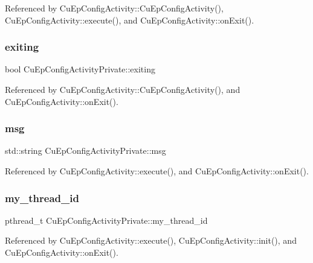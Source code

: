 Referenced by Cu\+Ep\+Config\+Activity\+::\+Cu\+Ep\+Config\+Activity(), Cu\+Ep\+Config\+Activity\+::execute(), and Cu\+Ep\+Config\+Activity\+::on\+Exit().

\mbox{\label{classCuEpConfigActivityPrivate_a7af8e2037c937736127bc9831356d975}} 
\subsubsection{exiting}
{\footnotesize\ttfamily bool Cu\+Ep\+Config\+Activity\+Private\+::exiting}



Referenced by Cu\+Ep\+Config\+Activity\+::\+Cu\+Ep\+Config\+Activity(), and Cu\+Ep\+Config\+Activity\+::on\+Exit().

\mbox{\label{classCuEpConfigActivityPrivate_a3ce255a920ffc468409c8615d6648bb5}} 
\subsubsection{msg}
{\footnotesize\ttfamily std\+::string Cu\+Ep\+Config\+Activity\+Private\+::msg}



Referenced by Cu\+Ep\+Config\+Activity\+::execute(), and Cu\+Ep\+Config\+Activity\+::on\+Exit().

\mbox{\label{classCuEpConfigActivityPrivate_a8ba2277d7f0ccb129ed4a9d87a79e57c}} 
\subsubsection{my\+\_\+thread\+\_\+id}
{\footnotesize\ttfamily pthread\+\_\+t Cu\+Ep\+Config\+Activity\+Private\+::my\+\_\+thread\+\_\+id}



Referenced by Cu\+Ep\+Config\+Activity\+::execute(), Cu\+Ep\+Config\+Activity\+::init(), and Cu\+Ep\+Config\+Activity\+::on\+Exit().

\mbox{\label{classCuEpConfigActivityPrivate_ade98f30dbb876ad9a87c7c9893f4eb31}} 
